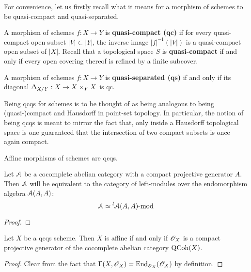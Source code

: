         For convenience, let us firstly recall what it means for a morphism of schemes to be quasi-compact and quasi-separated.
        \begin{definition} \label{def: qcqs}
            A morphism of schemes $f: X \to Y$ is \textbf{quasi-compact (qc)} if for every quasi-compact open subset $|V| \subset |Y|$, the inverse image $|f|^{-1}(|V|)$ is a quasi-compact open subset of $|X|$. Recall that a topological space $S$ is \textbf{quasi-compact} if and only if every open covering thereof is refined by a finite subcover. 

            A morphism of schemes $f: X \to Y$ is \textbf{quasi-separated (qs)} if and only if its diagonal $\Delta_{X/Y}: X \to X \x_Y X$ is qc.
        \end{definition}
        \begin{remark}
            Being qcqs for schemes is to be thought of as being analogous to being (quasi-)compact and Hausdorff in point-set topology. In particular, the notion of being qcqs is meant to mirror the fact that, only inside a Hausdorff topological space is one guaranteed that the intersection of two compact subsets is once again compact.  
        \end{remark}
        \begin{lemma} \label{lemma: affine_morphisms_are_qcqs}
            Affine morphisms of schemes are qcqs.
        \end{lemma}
        \begin{lemma}
            Let $\mathcal{A}$ be a cocomplete abelian category with a compact projective generator $A$. Then $\mathcal{A}$ will be equivalent to the category of left-modules over the endomorphism algebra $\mathcal{A}(A, A)$:
                $$\mathcal{A} \simeq {}^l\mathcal{A}(A, A)\text{-}\mathrm{mod}$$
        \end{lemma}
            \begin{proof}
                
            \end{proof}
        \begin{theorem} \label{theorem: compact_generation_of_qcoh_on_affine_schemes}
            Let $X$ be a qcqs scheme. Then $X$ is affine if and only if $\mathscr{O}_X$ is a compact projective generator of the cocomplete abelian category $\mathrm{QCoh}(X)$.
        \end{theorem}
            \begin{proof}
                Clear from the fact that $\Gamma(X, \mathscr{O}_X) = \mathrm{End}_{\mathscr{O}_X}(\mathscr{O}_X)$ by definition.
            \end{proof}
